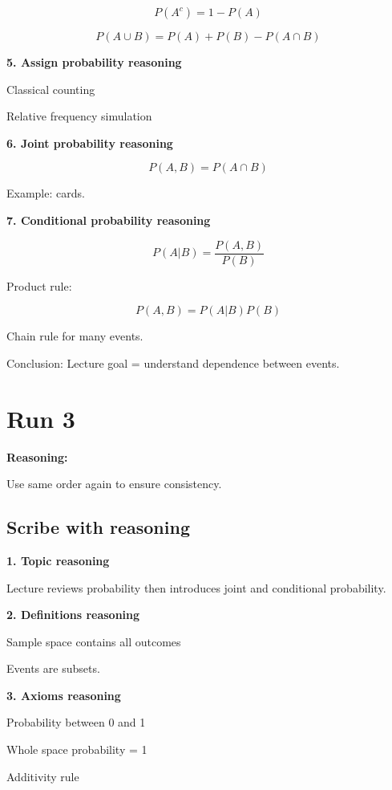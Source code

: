 \documentclass[12pt]{article}
\begin{document}
\[
P(A^c) = 1 - P(A)
\]

\[
P(A \cup B) = P(A) + P(B) - P(A \cap B)
\]

\bigskip

\textbf{5. Assign probability reasoning}

Classical counting

Relative frequency simulation

\bigskip

\textbf{6. Joint probability reasoning}

\[
P(A,B) = P(A \cap B)
\]

Example: cards.

\bigskip

\textbf{7. Conditional probability reasoning}

\[
P(A|B) = \frac{P(A,B)}{P(B)}
\]

Product rule:

\[
P(A,B) = P(A|B)P(B)
\]

Chain rule for many events.

\bigskip

Conclusion: Lecture goal = understand dependence between events.


\newpage

\section*{Run 3}

\textbf{Reasoning:}

Use same order again to ensure consistency.

\subsection*{Scribe with reasoning}

\textbf{1. Topic reasoning}

Lecture reviews probability then introduces joint and conditional probability.

\bigskip

\textbf{2. Definitions reasoning}

Sample space contains all outcomes

Events are subsets.

\bigskip

\textbf{3. Axioms reasoning}

Probability between 0 and 1

Whole space probability = 1

Additivity rule
\end{document}
